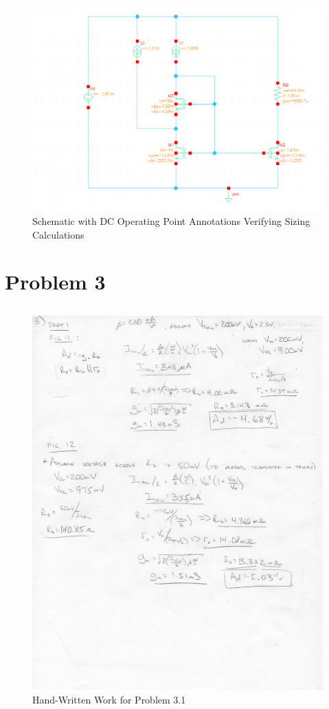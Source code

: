 \documentclass{article}
\begin{document}
\begin{figure}[H]
\centering
\includegraphics[width=6in]{p2_6_dcop.png}
\caption{Schematic with DC Operating Point Annotations Verifying Sizing Calculations}
\label{2_6_dcop}
\end{figure}
\newpage

\section{Problem 3}
\subsection{}

\begin{figure}[H]
\centering
\includegraphics[width=6in]{1_9}
\caption{Hand-Written Work for Problem 3.1}
\label{3_1}
\end{figure}
\end{document}
